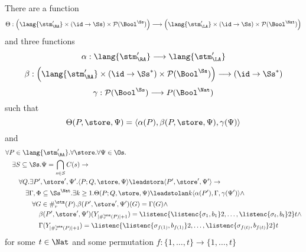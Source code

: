 \begin{prop}
  \label{prop:ratola}
  There are a function
  $$
  \Theta: \left(\lang{\stm_\RA'}\times \left(\id\to{\Ss}\right)\times \mathcal P (\Bool^\Ss) \right)
  \longrightarrow
  \left(\lang{\stm_\LA'}\times \left(\id\to{\Ss}\right)\times \mathcal P (\Bool^\Nat) \right)
  $$
  and three functions
  $$
  \alpha: \lang{\stm_\RA'}
  \longrightarrow
  \lang{\stm_\LA'}
  $$
  $$
  \beta:\left(\lang {\stm_\RA'}\times\left(\id\to{\Ss^*}\right)\times \mathcal P (\Bool^\Ss) \right)
  \longrightarrow
  \left(\id\to{\Ss^*}\right)
  $$
  $$
  \gamma:\mathcal P (\Bool^\Ss)
  \longrightarrow
  P (\Bool^\Nat)
  $$
  such that
  $$
  \Theta(P, \store, \Psi) = \langle \alpha(P), \beta(P, \store, \Psi), \gamma(\Psi)\rangle
  $$
  and
  \begin{align*}
  &\forall P \in \lang{\stm_\RA'}.\forall \store.\forall \Psi \in \Os.\\
  &\quad\exists S \subseteq \Ss. \Psi = \bigcap_{s \in S}C(s) \to\\
  &\quad\quad\forall Q.\exists P', \store', \Psi'.\langle P;Q, \store, \Psi\rangle \leadstora \langle P', \store', \Psi'\rangle \to\\
  &\quad\quad\quad\exists \Gamma, \Phi \subseteq \Ss^\Nat.\exists k\ge 1.\Theta(P;Q, \store, \Psi) \leadstolan k \langle\alpha(P'), \Gamma, \gamma(\Psi')\rangle\land\\
  & \quad\quad\quad\quad \forall G \in \#_r^\stm(P).\beta(P', \store', \Psi')(G)=\Gamma(G) \land\\ & \quad\quad\quad\quad\quad\beta(P',\store', \Psi')(Y_{{|\#_r^\stm(P)|+1}})=\listenc{\listenc {\sigma_1, b_1} 2, \ldots, \listenc {\sigma_t, b_t} 2}t \land\\
  & \quad\quad\quad\quad\quad \Gamma(Y_{{|\#_r^\stm(P)|+1}})=\listenc{\listenc {\sigma_{f(1)}, b_{f(1)}} 2, \ldots, \listenc {\sigma_{f(t)}, b_{f(t)}} 2}t
  \end{align*}
  for some $t \in \Nat$ and some permutation $f:  \{1, \ldots, t\}\longrightarrow \{1, \ldots, t\}$
\end{prop}

